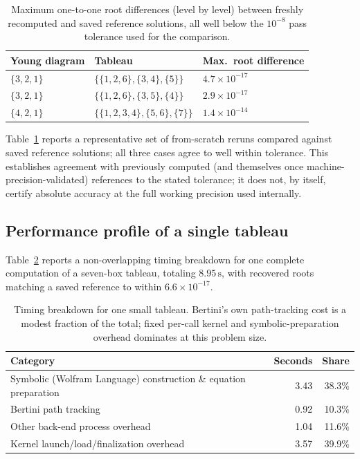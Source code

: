 \documentclass[11pt]{article}
\begin{document}
\begin{table}[H]
\centering
\begin{tabular}{@{}lll@{}}
\toprule
Young diagram & Tableau & Max.\ root difference \\
\midrule
$\{3,2,1\}$ & $\{\{1,2,6\},\{3,4\},\{5\}\}$ & $4.7\times10^{-17}$ \\
$\{3,2,1\}$ & $\{\{1,2,6\},\{3,5\},\{4\}\}$ & $2.9\times10^{-17}$ \\
$\{4,2,1\}$ & $\{\{1,2,3,4\},\{5,6\},\{7\}\}$ & $1.4\times10^{-14}$ \\
\bottomrule
\end{tabular}
\caption{Maximum one-to-one root differences (level by level) between freshly recomputed and saved reference solutions, all well below the $10^{-8}$ pass tolerance used for the comparison.}
\label{tab:accuracy}
\end{table}

Table~\ref{tab:accuracy} reports a representative set of from-scratch
reruns compared against saved reference solutions; all three cases agree
to well within tolerance. This establishes agreement with previously
computed (and themselves once machine-precision-validated) references to
the stated tolerance; it does not, by itself, certify absolute accuracy at
the full working precision used internally.

\subsection{Performance profile of a single tableau}

Table~\ref{tab:profile} reports a non-overlapping timing breakdown for one
complete computation of a seven-box tableau, totaling $8.95\,\mathrm{s}$,
with recovered roots matching a saved reference to within
$6.6\times10^{-17}$.

\begin{table}[H]
\centering
\begin{tabular}{@{}lrr@{}}
\toprule
Category & Seconds & Share \\
\midrule
Symbolic (Wolfram Language) construction \& equation preparation & 3.43 & 38.3\% \\
Bertini path tracking & 0.92 & 10.3\% \\
Other back-end process overhead & 1.04 & 11.6\% \\
Kernel launch/load/finalization overhead & 3.57 & 39.9\% \\
\bottomrule
\end{tabular}
\caption{Timing breakdown for one small tableau. Bertini's own path-tracking cost is a modest fraction of the total; fixed per-call kernel and symbolic-preparation overhead dominates at this problem size.}
\label{tab:profile}
\end{table}
\end{document}
